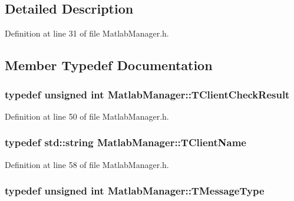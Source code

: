 \subsection{Detailed Description}


Definition at line 31 of file Matlab\-Manager.\-h.



\subsection{Member Typedef Documentation}
\hypertarget{class_matlab_manager_ac04dd0e7a4ab2efafe9604da5d44b318}{
\subsubsection[{T\-Client\-Check\-Result}]{\setlength{\rightskip}{0pt plus 5cm}typedef unsigned int {\bf Matlab\-Manager\-::\-T\-Client\-Check\-Result}\hspace{0.3cm}{\ttfamily [private]}}}\label{class_matlab_manager_ac04dd0e7a4ab2efafe9604da5d44b318}


Definition at line 50 of file Matlab\-Manager.\-h.

\hypertarget{class_matlab_manager_a62cb494115d46fdf4ecc6bd369fe0320}{
\subsubsection[{T\-Client\-Name}]{\setlength{\rightskip}{0pt plus 5cm}typedef std\-::string {\bf Matlab\-Manager\-::\-T\-Client\-Name}}}\label{class_matlab_manager_a62cb494115d46fdf4ecc6bd369fe0320}


Definition at line 58 of file Matlab\-Manager.\-h.

\hypertarget{class_matlab_manager_a36ad68398613c0d0ede6077af22d830c}{
\subsubsection[{T\-Message\-Type}]{\setlength{\rightskip}{0pt plus 5cm}typedef unsigned int {\bf Matlab\-Manager\-::\-T\-Message\-Type}\hspace{0.3cm}{\ttfamily [private]}}}\label{class_matlab_manager_a36ad68398613c0d0ede6077af22d830c}


